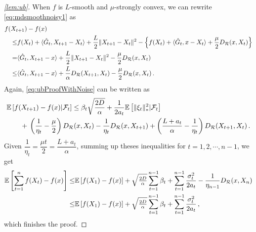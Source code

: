 \begin{proof}[\cref{lem:ub}]
When $f$ is $L$-smooth and $\mu$-strongly convex,  we can rewrite \eqref{eq:mdsmoothnoisy1} as
\begin{align*}
\MoveEqLeft
f(X_{t+1}) - f(x) \nonumber\\
 \le& f(X_t) + \ip{ \hat{G}_t, X_{t+1}-X_t } + \frac{L}{2} \norm{X_{t+1}-X_t}^2 - \left\{ f(X_t) + \ip{ \hat{G}_t, x-X_t}+\dfrac{\mu}{2}\DR(x, X_t) \right\} \nonumber \\
 =& \ip{\hat{G}_t, X_{t+1} - x } +  \frac{L}{2} \norm{X_{t+1}-X_t}^2-\dfrac{\mu}{2}\DR(x, X_t) \nonumber\\
 \le& \ip{\hat{G}_t,X_{t+1}-x} + \frac{L}{\alpha} D_{\mathcal{R}}(X_{t+1},X_t)-\dfrac{\mu}{2}\DR(x, X_t)\,.
\end{align*}
Again, \eqref{eq:ubProofWithNoise} can be written as
\begin{align*}
\MoveEqLeft \EE{f(X_{t+1}) - f(x) |\F_{t} }
\le
 \beta_t \sqrt{ \frac{2D}{\alpha} }+
\frac{1}{2a_t}  \EE{\norm{\xi_t}_*^2|\F_{t}}\\
&+{}\left(\dfrac{1}{\eta_t}-\dfrac{\mu}{2}  \right)\DR(x,X_t)-\dfrac{1}{\eta_t}\DR(x,X_{t+1})
+\left( \dfrac{L+a_t}{\alpha}-\dfrac{1}{\eta_t} \right)\DR(X_{t+1},X_t) \,.
\end{align*}
Given $\dfrac{1}{\eta_t}=\dfrac{\mu t}{2}=\dfrac{L+a_t}{\alpha}$, summing up theses inequalities for $t=1,2,\cdots, n-1$, we get
\begin{align*}
 \mathbb{E}\left[ \sum_{t=1}^n f(X_t) - f(x) \right]
\le&
  \mathbb{E}\left[f(X_1)-f(x)\right] + \sqrt{\tfrac{2D}{\alpha}} \sum_{t=1}^{n-1} \beta_t +
	  \sum_{t=1}^{n-1}\frac{\sigma_t^2}{2a_t}-\dfrac{1}{\eta_{n-1}}D_{\mathcal{R}}(x,X_{n})\\
\le&
  \mathbb{E}\left[f(X_1)-f(x)\right] + \sqrt{\tfrac{2D}{\alpha}} \sum_{t=1}^{n-1} \beta_t +
	  \sum_{t=1}^{n-1}\frac{\sigma_t^2}{2a_t}\,,
\end{align*}
which finishes the proof.
\end{proof}
